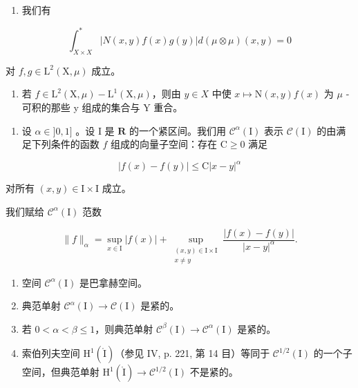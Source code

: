 \begin{enumerate}
\def\labelenumi{\alph{enumi})}
\tightlist
\item
  我们有
\end{enumerate}

\[
\int_ {X \times X} ^ {*} | N (x, y) f (x) g (y) | d (\mu \otimes \mu) (x, y) = 0
\]

对 \(f, g \in \mathrm{L}^2(\mathrm{X}, \mu)\) 成立。

\begin{enumerate}
\def\labelenumi{\alph{enumi})}
\setcounter{enumi}{1}
\tightlist
\item
  若 \(f \in \mathrm{L}^{2}(\mathrm{X}, \mu) - \mathrm{L}^{1}(\mathrm{X}, \mu)\)，则由 \(y \in X\) 中使 \(x \mapsto \mathrm{N}(x, y)f(x)\) 为 \(\mu\) -可积的那些 y 组成的集合与 Y 重合。
\end{enumerate}

\begin{enumerate}
\def\labelenumi{\arabic{enumi})}
\setcounter{enumi}{3}
\tightlist
\item
  设 \(\alpha \in ]0,1]\) 。设 I 是 \(\mathbf{R}\) 的一个紧区间。我们用 \(\mathcal{C}^{\alpha}(\mathrm{I})\) 表示 \(\mathcal{C}(\mathrm{I})\) 的由满足下列条件的函数 \(f\) 组成的向量子空间：存在 \(\mathrm{C} \geqslant 0\) 满足
\end{enumerate}

\[
| f (x) - f (y) | \leqslant \mathrm{C} | x - y | ^ {\alpha}
\]

对所有 \((x,y)\in\mathrm{I}\times\mathrm{I}\) 成立。

我们赋给 \(\mathcal{C}^{\alpha}(\mathrm{I})\) 范数

\[
\| f\|_{\alpha} = \sup_{x\in \mathrm{I}}|f(x)| + \sup_{\substack{(x,y)\in \mathrm{I}\times \mathrm{I}\\ x\neq y}}\frac{|f(x) - f(y)|}{|x - y|^{\alpha}}.
\]

\begin{enumerate}
\def\labelenumi{\alph{enumi})}
\item
  空间 \(\mathcal{C}^{\alpha}(\mathrm{I})\) 是巴拿赫空间。
\item
  典范单射 \(\mathcal{C}^{\alpha}(\mathrm{I})\to \mathcal{C}(\mathrm{I})\) 是紧的。
\item
  若 \(0 < \alpha < \beta \leqslant 1\)，则典范单射 \(\mathcal{C}^{\beta}(\mathrm{I}) \to \mathcal{C}^{\alpha}(\mathrm{I})\) 是紧的。\\
\item
  索伯列夫空间 \(\mathrm{H}^{1}(\mathring{\mathrm{I}})\)（参见 IV, p. 221, 第 14 目）等同于 \(\mathcal{C}^{1/2}(\mathrm{I})\) 的一个子空间，但典范单射 \(\mathrm{H}^{1}(\mathring{\mathrm{I}}) \to \mathcal{C}^{1/2}(\mathrm{I})\) 不是紧的。
\end{enumerate}

